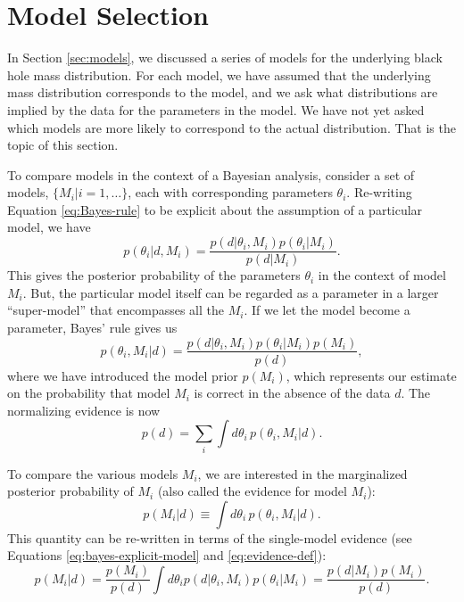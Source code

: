 \documentclass[preprint]{aastex}
\begin{document}
\section{Model Selection}
\label{sec:model-selection}

In Section \ref{sec:models}, we discussed a series of models for the
underlying black hole mass distribution.  For each model, we have
assumed that the underlying mass distribution corresponds to the
model, and we ask what distributions are implied by the data for the
parameters in the model.  We have not yet asked which models are more
likely to correspond to the actual distribution.  That is the topic of
this section.

To compare models in the context of a Bayesian analysis, consider a
set of models, $\{M_i| i = 1, \ldots\}$, each with corresponding
parameters $\theta_i$.  Re-writing Equation \eqref{eq:Bayes-rule} to
be explicit about the assumption of a particular model, we have
\begin{equation}
  \label{eq:bayes-explicit-model}
  p(\theta_i | d, M_i) = \frac{p(d|\theta_i, M_i) p(\theta_i | M_i)}{p(d|M_i)}.
\end{equation}
This gives the posterior probability of the parameters $\theta_i$ in
the context of model $M_i$.  But, the particular model itself can be
regarded as a parameter in a larger ``super-model'' that encompasses
all the $M_i$.  If we let the model become a parameter, Bayes' rule
gives us
\begin{equation}
  p(\theta_i, M_i|d) = \frac{p(d|\theta_i, M_i) p(\theta_i |M_i) p(M_i)}{p(d)},
\end{equation}
where we have introduced the model prior $p(M_i)$, which represents
our estimate on the probability that model $M_i$ is correct in the
absence of the data $d$.  The normalizing evidence is now
\begin{equation}
  p(d) = \sum_i \int d\theta_i\, p(\theta_i, M_i|d).
\end{equation}

To compare the various models $M_i$, we are interested in the
marginalized posterior probability of $M_i$ (also called the evidence
for model $M_i$):
\begin{equation}
  p(M_i|d) \equiv \int d\theta_i\, p(\theta_i, M_i|d).
\end{equation}
This quantity can be re-written in terms of the single-model evidence
(see Equations \eqref{eq:bayes-explicit-model} and
\eqref{eq:evidence-def}):
\begin{equation}
  \label{eq:model-evidence-def}
  p(M_i|d) = \frac{p(M_i)}{p(d)} \int d\theta_i
  p(d|\theta_i,M_i) p(\theta_i|M_i) = \frac{p(d|M_i) p(M_i)}{p(d)}.
\end{equation}
\end{document}
